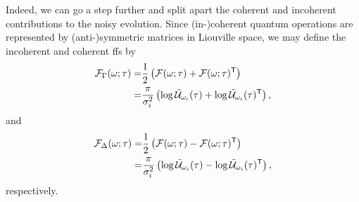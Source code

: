 Indeed, we can go a step further and split apart the coherent and incoherent contributions to the noisy evolution.
Since (in-)coherent quantum operations are represented by (anti-)symmetric matrices in Liouville space, we may define the incoherent and coherent \glspl{ff} by
\begin{equation}
    \label{eq:filter_function:incoherent}
    \begin{split}
        \mathcal{F}_\Gamma(\omega;\tau) =& \frac{1}{2}\left(\mathcal{F}(\omega;\tau) + \mathcal{F}(\omega;\tau)^\mathsf{T}\right) \\
                                   =& \frac{\pi}{\sigma_i^2}\left(\log\mathcal{\tilde{U}}_{\omega_i}(\tau) + \log\mathcal{\tilde{U}}_{\omega_i}(\tau)^\mathsf{T}\right),
    \end{split}
\end{equation}
and
\begin{equation}
    \label{eq:filter_function:coherent}
    \begin{split}
        \mathcal{F}_\Delta(\omega;\tau) =& \frac{1}{2}\left(\mathcal{F}(\omega;\tau) - \mathcal{F}(\omega;\tau)^\mathsf{T}\right) \\
                                   =& \frac{\pi}{\sigma_i^2}\left(\log\mathcal{\tilde{U}}_{\omega_i}(\tau) - \log\mathcal{\tilde{U}}_{\omega_i}(\tau)^\mathsf{T}\right),
    \end{split}
\end{equation}
respectively.

